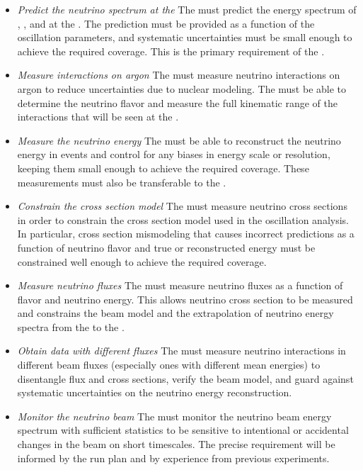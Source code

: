 \begin{itemize}
    \item  \textit{Predict the neutrino spectrum at the } The  must predict the energy spectrum of \numu, \anumu, \nue and \anue at the . The prediction must be provided as a function of the oscillation parameters, and systematic uncertainties must be small enough to achieve the required  coverage. This is the primary requirement of the  .
    
    \item \textit{Measure interactions on argon} The  must measure neutrino interactions on argon to reduce uncertainties due to nuclear modeling. The  must be able to determine the neutrino flavor and measure the full kinematic range of the interactions that will be seen at the .
    
    \item \textit{Measure the neutrino energy} The  must be able to reconstruct the neutrino energy in  events and control for any biases in energy scale or resolution, keeping them small enough to achieve the required  coverage. These measurements must also be transferable to the . 
    
    \item \textit{Constrain the cross section model} The  must measure neutrino cross sections in order to constrain the cross section model used in the oscillation analysis. In particular, cross section mismodeling that causes incorrect  predictions as a function of neutrino flavor and true or reconstructed energy must be constrained well enough to achieve the required  coverage. 
    
    \item \textit{Measure neutrino fluxes} The  must measure neutrino fluxes as a function of flavor and neutrino energy. This allows neutrino cross section to be measured and constrains the beam model and the extrapolation of neutrino energy spectra from the  to the .
    
    \item \textit{Obtain data with different fluxes} The  must measure neutrino interactions in different beam fluxes (especially ones with different mean energies) to disentangle flux and cross sections, verify the beam model, and guard against systematic uncertainties on the neutrino energy reconstruction.
    
    \item \textit{Monitor the neutrino beam} The  must monitor the neutrino beam energy spectrum with sufficient statistics to be sensitive to intentional or accidental changes in the beam on short timescales. The precise requirement will be informed by the run plan and by experience from previous experiments. 
    
\end{itemize}


